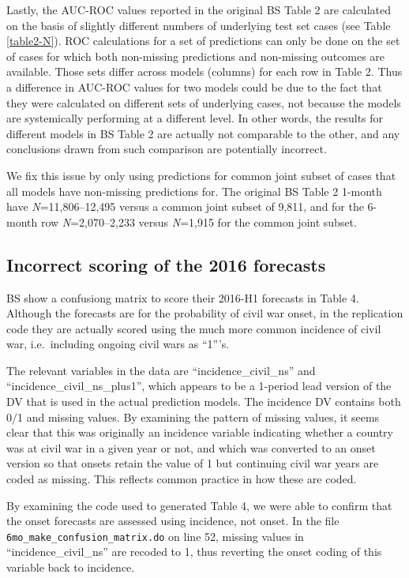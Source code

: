 \documentclass[]{article}
\begin{document}
Lastly, the AUC-ROC values reported in the original BS Table 2 are
calculated on the basis of slightly different numbers of underlying test
set cases (see Table \ref{table2-N}). ROC calculations for a set of
predictions can only be done on the set of cases for which both
non-missing predictions and non-missing outcomes are available. Those
sets differ across models (columns) for each row in Table 2. Thus a
difference in AUC-ROC values for two models could be due to the fact
that they were calculated on different sets of underlying cases, not
because the models are systemically performing at a different level. In
other words, the results for different models in BS Table 2 are actually
not comparable to the other, and any conclusions drawn from such
comparison are potentially incorrect.

We fix this issue by only using predictions for common joint subset of
cases that all models have non-missing predictions for. The original BS
Table 2 1-month have \emph{N}=11,806--12,495 versus a common joint
subset of 9,811, and for the 6-month row \emph{N}=2,070--2,233 versus
\emph{N}=1,915 for the common joint subset.

\hypertarget{incorrect-scoring-of-the-2016-forecasts}{%
\subsection{Incorrect scoring of the 2016
forecasts}\label{incorrect-scoring-of-the-2016-forecasts}}

BS show a confusiong matrix to score their 2016-H1 forecasts in Table 4.
Although the forecasts are for the probability of civil war onset, in
the replication code they are actually scored using the much more common
incidence of civil war, i.e.~including ongoing civil wars as ``1'''s.

The relevant variables in the data are ``incidence\_civil\_ns'' and
``incidence\_civil\_ns\_plus1'', which appears to be a 1-period lead
version of the DV that is used in the actual prediction models. The
incidence DV contains both 0/1 and missing values. By examining the
pattern of missing values, it seems clear that this was originally an
incidence variable indicating whether a country was at civil war in a
given year or not, and which was converted to an onset version so that
onsets retain the value of 1 but continuing civil war years are coded as
missing. This reflects common practice in how these are coded.

By examining the code used to generated Table 4, we were able to confirm
that the onset forecasts are assessed using incidence, not onset. In the
file \texttt{6mo\_make\_confusion\_matrix.do} on line 52, missing values
in ``incidence\_civil\_ns'' are recoded to 1, thus reverting the onset
coding of this variable back to incidence.
\end{document}
